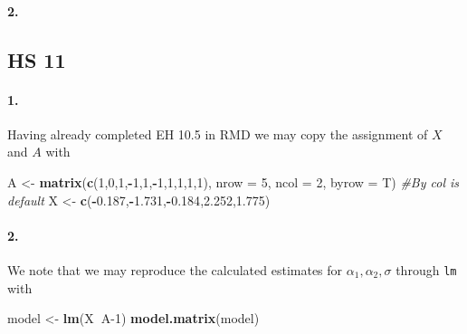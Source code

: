 \documentclass[
]{article}
\newenvironment{Shaded}{\begin{snugshade}}{\end{snugshade}}
\newcommand{\CommentTok}[1]{\textcolor[rgb]{0.56,0.35,0.01}{\textit{#1}}}
\newcommand{\DataTypeTok}[1]{\textcolor[rgb]{0.13,0.29,0.53}{#1}}
\newcommand{\DecValTok}[1]{\textcolor[rgb]{0.00,0.00,0.81}{#1}}
\newcommand{\FloatTok}[1]{\textcolor[rgb]{0.00,0.00,0.81}{#1}}
\newcommand{\KeywordTok}[1]{\textcolor[rgb]{0.13,0.29,0.53}{\textbf{#1}}}
\newcommand{\NormalTok}[1]{#1}
\newcommand{\OperatorTok}[1]{\textcolor[rgb]{0.81,0.36,0.00}{\textbf{#1}}}
\newcommand{\StringTok}[1]{\textcolor[rgb]{0.31,0.60,0.02}{#1}}
\begin{document}
\hypertarget{section-43}{%
\paragraph{\texorpdfstring{\textbf{2.}}{2.}}\label{section-43}}

\hypertarget{hs-11}{%
\subsection{HS 11}\label{hs-11}}

\hypertarget{section-44}{%
\paragraph{\texorpdfstring{\textbf{1.}}{1.}}\label{section-44}}

Having already completed EH 10.5 in RMD we may copy the assignment of
\(X\) and \(A\) with

\begin{Shaded}
\begin{Highlighting}[]
\NormalTok{A <-}\StringTok{ }\KeywordTok{matrix}\NormalTok{(}\KeywordTok{c}\NormalTok{(}\DecValTok{1}\NormalTok{,}\DecValTok{0}\NormalTok{,}\DecValTok{1}\NormalTok{,}\OperatorTok{-}\DecValTok{1}\NormalTok{,}\DecValTok{1}\NormalTok{,}\OperatorTok{-}\DecValTok{1}\NormalTok{,}\DecValTok{1}\NormalTok{,}\DecValTok{1}\NormalTok{,}\DecValTok{1}\NormalTok{,}\DecValTok{1}\NormalTok{), }\DataTypeTok{nrow =} \DecValTok{5}\NormalTok{, }\DataTypeTok{ncol =} \DecValTok{2}\NormalTok{, }\DataTypeTok{byrow =}\NormalTok{ T) }\CommentTok{#By col is default}
\NormalTok{X <-}\StringTok{ }\KeywordTok{c}\NormalTok{(}\OperatorTok{-}\FloatTok{0.187}\NormalTok{,}\OperatorTok{-}\FloatTok{1.731}\NormalTok{,}\OperatorTok{-}\FloatTok{0.184}\NormalTok{,}\FloatTok{2.252}\NormalTok{,}\FloatTok{1.775}\NormalTok{)}
\end{Highlighting}
\end{Shaded}

\hypertarget{section-45}{%
\paragraph{\texorpdfstring{\textbf{2.}}{2.}}\label{section-45}}

We note that we may reproduce the calculated estimates for
\(\alpha_1,\alpha_2,\sigma\) through \texttt{lm} with

\begin{Shaded}
\begin{Highlighting}[]
\NormalTok{model <-}\StringTok{ }\KeywordTok{lm}\NormalTok{(X}\OperatorTok{~}\NormalTok{A}\DecValTok{-1}\NormalTok{)}
\KeywordTok{model.matrix}\NormalTok{(model)}
\end{Highlighting}
\end{Shaded}
\end{document}
